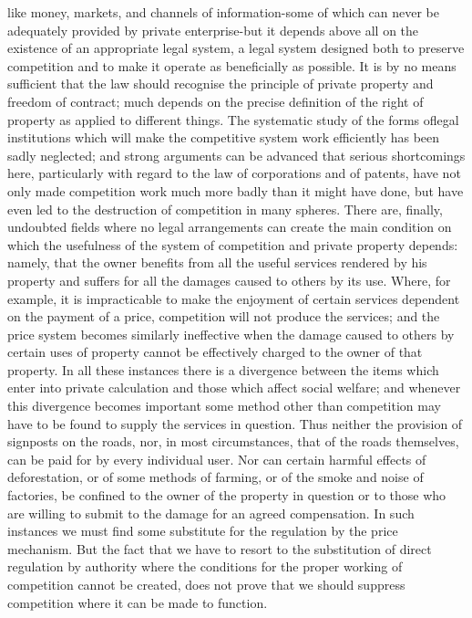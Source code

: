 \documentclass[11pt,openany]{book}
\begin{document}
like money, markets, and channels of information-some of which can never be adequately provided by private enterprise-but it depends above all on the existence of an appropriate legal system, a legal system designed both to preserve competition and to make it operate as beneficially as possible. It is by no means sufficient that the law should recognise the principle of private property and freedom of contract; much depends on the precise definition of the right of property as applied to different things. The systematic study of the forms oflegal institutions which will make the competitive system work efficiently has been sadly neglected; and strong arguments can be advanced that serious shortcomings here, particularly with regard to the law of corporations and of patents, have not only made competition work much more badly than it might have done, but have even led to the destruction of competition in many spheres. There are, finally, undoubted fields where no legal arrangements can create the main condition on which the usefulness of the system of competition and private property depends: namely, that the owner benefits from all the useful services rendered by his property and suffers for all the damages caused to others by its use. Where, for example, it is impracticable to make the enjoyment of certain services dependent on the payment of a price, competition will not produce the services; and the price system becomes similarly ineffective when the damage caused to others by certain uses of property cannot be effectively charged to the owner of that property. In all these instances there is a divergence between the items which enter into private calculation and those which affect social welfare; and whenever this divergence becomes important some method other than competition may have to be found to supply the services in question. Thus neither the provision of signposts on the roads, nor, in most circumstances, that of the roads themselves, can be paid for by every individual user. Nor can certain harmful effects of deforestation, or of some methods of farming, or of the smoke and noise of factories, be confined to the owner of the property in question or to those who are willing to submit to the damage for an agreed compensation. In such instances we must find some substitute for the regulation by the price mechanism. But the fact that we have to resort to the substitution of direct regulation by authority where the conditions for the proper working of competition cannot be created, does not prove that we should suppress competition where it can be made to function.
\end{document}
